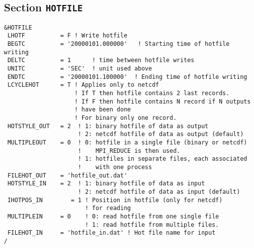 \documentclass[12pt]{amsart}
\begin{document}
\subsection{Section {\tt HOTFILE}}
\begin{verbatim}
&HOTFILE
 LHOTF          = F ! Write hotfile
 BEGTC          = '20000101.000000'   ! Starting time of hotfile writing
 DELTC          = 1      ! time between hotfile writes
 UNITC          = 'SEC'  ! unit used above
 ENDTC          = '20000101.100000'  ! Ending time of hotfile writing
 LCYCLEHOT      = T ! Applies only to netcdf
                    ! If T then hotfile contains 2 last records.
                    ! If F then hotfile contains N record if N outputs
                    ! have been done
                    ! For binary only one record.
 HOTSTYLE_OUT   = 2  ! 1: binary hotfile of data as output
                     ! 2: netcdf hotfile of data as output (default)
 MULTIPLEOUT    = 0  ! 0: hotfile in a single file (binary or netcdf)
                     !    MPI_REDUCE is then used.
                     ! 1: hotfiles in separate files, each associated
                     !    with one process
 FILEHOT_OUT    = 'hotfile_out.dat' 
 HOTSTYLE_IN    = 2  ! 1: binary hotfile of data as input
                     ! 2: netcdf hotfile of data as input (default)
 IHOTPOS_IN        = 1 ! Position in hotfile (only for netcdf)
                       ! for reading
 MULTIPLEIN     = 0    ! 0: read hotfile from one single file
                       ! 1: read hotfile from multiple files.
 FILEHOT_IN     = 'hotfile_in.dat' ! Hot file name for input
/
\end{verbatim}
\end{document}
